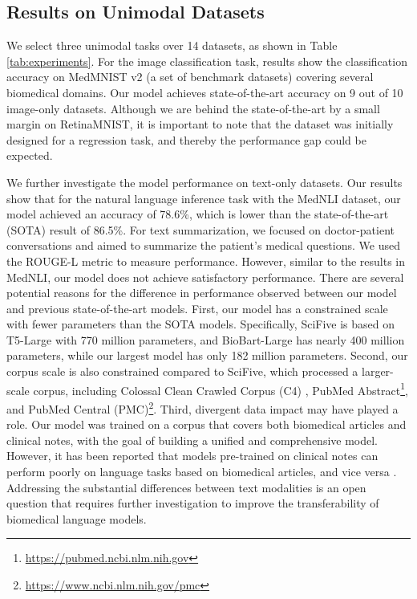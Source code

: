 \documentclass[10pt]{article} \usepackage[preprint]{tmlr}
\begin{document}
\subsection{Results on Unimodal Datasets}
We select three unimodal tasks over 14 datasets, as shown in Table \ref{tab:experiments}. For the image classification task, results show the classification accuracy on MedMNIST v2 \cite{medmnistv2} (a set of benchmark datasets) covering several biomedical domains. Our  model achieves state-of-the-art accuracy on 9 out of 10 image-only datasets. Although we are behind the state-of-the-art by a small margin on RetinaMNIST, it is important to note that the dataset was initially designed for a regression task, and thereby the  performance gap could be expected.

We further investigate the model performance on text-only datasets. Our results show that for the natural language inference task with the MedNLI dataset, our model achieved an accuracy of 78.6\%, which is lower than the state-of-the-art (SOTA) result of 86.5\%. For text summarization, we focused on doctor-patient conversations and aimed to summarize the patient's medical questions. We used the ROUGE-L metric to measure performance. However, similar to the results in MedNLI, our model does not achieve satisfactory performance. There are several potential reasons for the difference in performance observed between our model and previous state-of-the-art models. First, our model has a constrained scale with fewer parameters than the SOTA models. Specifically, SciFive is based on T5-Large \citep{raffel2020exploring} with 770 million parameters, and BioBart-Large has nearly 400 million parameters, while our largest model has only 182 million parameters. Second, our corpus scale is also constrained compared to SciFive, which processed a larger-scale corpus, including Colossal Clean Crawled Corpus (C4) \citep{raffel2020exploring}, PubMed Abstract\footnote{\url{https://pubmed.ncbi.nlm.nih.gov}}, and PubMed Central (PMC)\footnote{\url{https://www.ncbi.nlm.nih.gov/pmc}}. Third, divergent data impact may have played a role. Our model was trained on a corpus that covers both biomedical articles and clinical notes, with the goal of building a unified and comprehensive model. However, it has been reported that models pre-trained on clinical notes can perform poorly on language tasks based on biomedical articles, and vice versa \citep{gu2021domain, alsentzer-etal-2019-publicly, lehman2023we}. Addressing the substantial differences between text modalities is an open question that requires further investigation to improve the transferability of biomedical language models.
\end{document}
